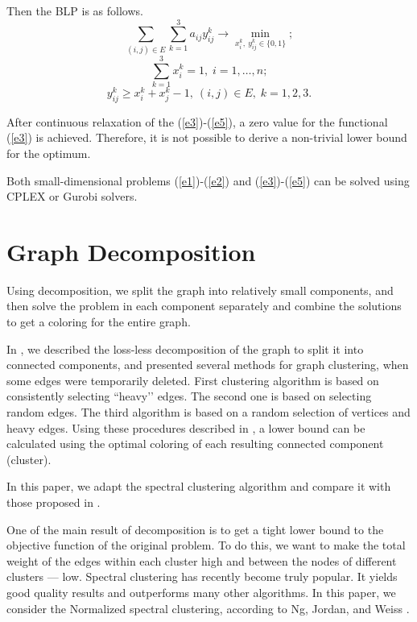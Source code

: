 \documentclass[runningheads]{llncs}
\begin{document}
Then the BLP is as follows.
\begin{equation}\label{e3}
  \sum_{(i,j)\in E} \sum_{k=1}^{3} a_{ij}y_{ij}^{k} \to\min_{x_{i}^{k}, \ y_{ij}^{k} \in \{0, 1\}};
\end{equation}
\begin{equation}\label{e4}
  \sum_{k = 1}^{3} x_{i}^{k}=1,\; i=1,\ldots,n;
\end{equation}
\begin{equation}\label{e5}
  y_{ij}^{k}\geq x_{i}^{k}+x_{j}^{k}-1,\ (i,j)\in E, \; k=1,2,3.
\end{equation}

After continuous relaxation of the (\ref{e3})-(\ref{e5}), a zero value for the functional (\ref{e3}) is achieved. Therefore, it is not possible to derive a non-trivial lower bound for the optimum.

Both small-dimensional problems (\ref{e1})-(\ref{e2}) and (\ref{e3})-(\ref{e5}) can be solved using CPLEX or Gurobi solvers.

\section{Graph Decomposition}
Using decomposition, we split the graph into relatively small components, and then solve the problem in each component separately and combine the solutions to get a coloring for the entire graph.

In \cite{Erzin:24}, we described the loss-less decomposition of the graph to split it into connected components, and presented several methods for graph clustering, when some edges were temporarily deleted. First clustering algorithm is based on consistently selecting ``heavy’’ edges. The second one is based on selecting random edges. The third algorithm is based on a random selection of vertices and heavy edges. Using these procedures described in \cite{Erzin:24}, a lower bound can be calculated using the optimal coloring of each resulting connected component (cluster).

In this paper, we adapt the spectral clustering algorithm \cite{Luxburg:06} and compare it with those proposed in \cite{Erzin:24}.

One of the main result of decomposition is to get a tight lower bound to the objective function of the original problem. To do this, we want to make the total weight of the edges within each cluster high and between the nodes of different clusters — low. Spectral clustering has recently become truly popular. It yields good quality results and outperforms many other algorithms. In this paper, we consider the Normalized spectral clustering, according to Ng, Jordan, and Weiss \cite{Jordan:01}.
\end{document}
